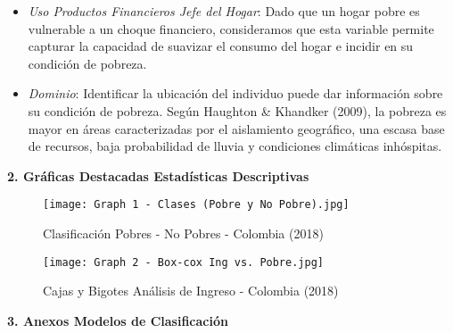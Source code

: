 \documentclass[11pt]{article}
\begin{document}
\begin{itemize}
\item \emph{Uso Productos Financieros Jefe del Hogar}: Dado que un hogar pobre es vulnerable a un choque financiero, consideramos que esta variable permite capturar  la capacidad de suavizar el consumo del hogar e incidir en su condición de pobreza.  
\item \emph{Dominio}: Identificar la ubicación del individuo puede dar información sobre su condición de pobreza. Según Haughton \& Khandker (2009), la pobreza es mayor en áreas caracterizadas por el aislamiento geográfico, una escasa base de recursos, baja probabilidad de lluvia y condiciones climáticas inhóspitas.
\end{itemize}

\textbf{2. Gráficas Destacadas Estadísticas Descriptivas}

\clearpage
\begin{figure}[h]
\caption{Clasificación Pobres - No Pobres - Colombia (2018)}
\centering
\texttt{[image: Graph 1 - Clases (Pobre y No Pobre).jpg]}
\end{figure}

\begin{figure}[h]
\caption{Cajas y Bigotes Análisis de Ingreso - Colombia (2018)}
\centering
\texttt{[image: Graph 2 - Box-cox Ing vs. Pobre.jpg]}
\end{figure}

\clearpage
\textbf{3. Anexos Modelos de Clasificación}
\end{document}
